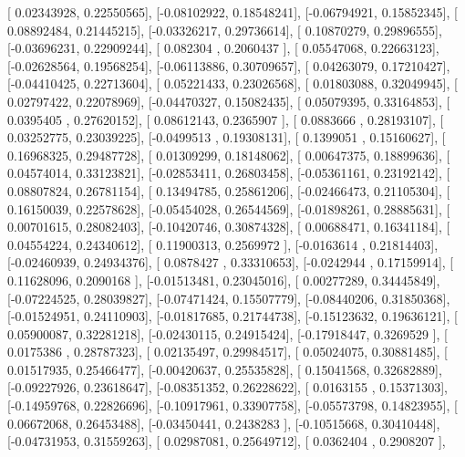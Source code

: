 \documentclass{article}
\begin{document}
       [ 0.02343928,  0.22550565],
       [-0.08102922,  0.18548241],
       [-0.06794921,  0.15852345],
       [ 0.08892484,  0.21445215],
       [-0.03326217,  0.29736614],
       [ 0.10870279,  0.29896555],
       [-0.03696231,  0.22909244],
       [ 0.082304  ,  0.2060437 ],
       [ 0.05547068,  0.22663123],
       [-0.02628564,  0.19568254],
       [-0.06113886,  0.30709657],
       [ 0.04263079,  0.17210427],
       [-0.04410425,  0.22713604],
       [ 0.05221433,  0.23026568],
       [ 0.01803088,  0.32049945],
       [ 0.02797422,  0.22078969],
       [-0.04470327,  0.15082435],
       [ 0.05079395,  0.33164853],
       [ 0.0395405 ,  0.27620152],
       [ 0.08612143,  0.2365907 ],
       [ 0.0883666 ,  0.28193107],
       [ 0.03252775,  0.23039225],
       [-0.0499513 ,  0.19308131],
       [ 0.1399051 ,  0.15160627],
       [ 0.16968325,  0.29487728],
       [ 0.01309299,  0.18148062],
       [ 0.00647375,  0.18899636],
       [ 0.04574014,  0.33123821],
       [-0.02853411,  0.26803458],
       [-0.05361161,  0.23192142],
       [ 0.08807824,  0.26781154],
       [ 0.13494785,  0.25861206],
       [-0.02466473,  0.21105304],
       [ 0.16150039,  0.22578628],
       [-0.05454028,  0.26544569],
       [-0.01898261,  0.28885631],
       [ 0.00701615,  0.28082403],
       [-0.10420746,  0.30874328],
       [ 0.00688471,  0.16341184],
       [ 0.04554224,  0.24340612],
       [ 0.11900313,  0.2569972 ],
       [-0.0163614 ,  0.21814403],
       [-0.02460939,  0.24934376],
       [ 0.0878427 ,  0.33310653],
       [-0.0242944 ,  0.17159914],
       [ 0.11628096,  0.2090168 ],
       [-0.01513481,  0.23045016],
       [ 0.00277289,  0.34445849],
       [-0.07224525,  0.28039827],
       [-0.07471424,  0.15507779],
       [-0.08440206,  0.31850368],
       [-0.01524951,  0.24110903],
       [-0.01817685,  0.21744738],
       [-0.15123632,  0.19636121],
       [ 0.05900087,  0.32281218],
       [-0.02430115,  0.24915424],
       [-0.17918447,  0.3269529 ],
       [ 0.0175386 ,  0.28787323],
       [ 0.02135497,  0.29984517],
       [ 0.05024075,  0.30881485],
       [ 0.01517935,  0.25466477],
       [-0.00420637,  0.25535828],
       [ 0.15041568,  0.32682889],
       [-0.09227926,  0.23618647],
       [-0.08351352,  0.26228622],
       [ 0.0163155 ,  0.15371303],
       [-0.14959768,  0.22826696],
       [-0.10917961,  0.33907758],
       [-0.05573798,  0.14823955],
       [ 0.06672068,  0.26453488],
       [-0.03450441,  0.2438283 ],
       [-0.10515668,  0.30410448],
       [-0.04731953,  0.31559263],
       [ 0.02987081,  0.25649712],
       [ 0.0362404 ,  0.2908207 ],
\end{document}
